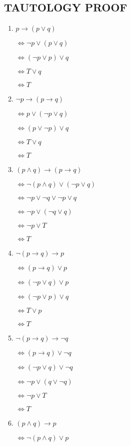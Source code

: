\documentclass{../../cls/sig-alternate-05-2015}
\begin{document}
\subsection{TAUTOLOGY PROOF}
\begin{enumerate}
\item $p\rightarrow (p\vee q )$

$\Leftrightarrow \neg p \vee (p \vee q)$

$\Leftrightarrow (\neg p \vee p) \vee q$

$\Leftrightarrow T \vee q$ 

$\Leftrightarrow T$
\item 	$\neg p \rightarrow (p\rightarrow q)$

$\Leftrightarrow p \vee (\neg p\vee q)$

$\Leftrightarrow (p \vee \neg p) \vee q$

$\Leftrightarrow T \vee q$
	
$\Leftrightarrow T$
\item $(p\wedge q)\rightarrow (p\rightarrow q)$

$\Leftrightarrow \neg (p\wedge q)\vee (\neg p\vee q)$

$\Leftrightarrow \neg p\vee \neg q\vee \neg p\vee q$

$\Leftrightarrow \neg p\vee (\neg q \vee q)$

$\Leftrightarrow \neg p\vee T$

$\Leftrightarrow  T$
\item $\neg (p\rightarrow q)\rightarrow p$

$\Leftrightarrow  (p\rightarrow q)\vee p$

$\Leftrightarrow  (\neg p\vee q)\vee p$

$\Leftrightarrow  (\neg p\vee p)\vee q$

$\Leftrightarrow  T\vee p$

$\Leftrightarrow  T$
\item $\neg (p \rightarrow q) \rightarrow \neg q$

$\Leftrightarrow  (p \rightarrow q) \vee \neg q$

$\Leftrightarrow  (\neg p \vee q) \vee \neg q$

$\Leftrightarrow  \neg p \vee (q \vee \neg q)$

$\Leftrightarrow  \neg p \vee T$

$\Leftrightarrow   T$
	
\item $(p\wedge q)\rightarrow p$

$\Leftrightarrow \neg (p\wedge q)\vee p$


\end{enumerate}
\end{document}
